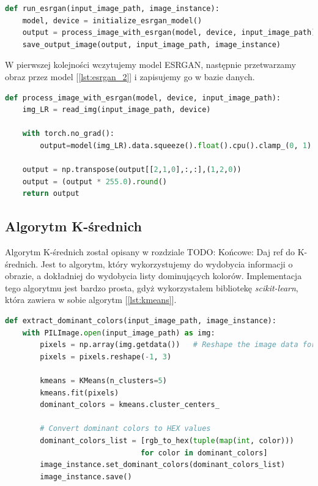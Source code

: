\begin{lstlisting}[language=Python, caption=Implementacja algorytmu ESRGAN., label={lst:esrgan}]    
def run_esrgan(input_image_path, image_instance):
    model, device = initialize_esrgan_model()
    output = process_image_with_esrgan(model, device, input_image_path)
    save_output_image(output, input_image_path, image_instance)
\end{lstlisting}

W pierwszej kolejności wczytujemy model ESRGAN, następnie przetwarzamy obraz przez model [\ref{lst:esrgan_2}] i zapisujemy go w bazie danych.


\begin{lstlisting}[language=Python, caption=Przetwarzanie przez model ESRGAN., label={lst:esrgan_2}]
def process_image_with_esrgan(model, device, input_image_path):
    img_LR = read_img(input_image_path, device)

    with torch.no_grad():
        output=model(img_LR).data.squeeze().float().cpu().clamp_(0, 1).numpy()
    
    output = np.transpose(output[[2,1,0],:,:],(1,2,0))
    output = (output * 255.0).round()
    return output
\end{lstlisting}


\subsection*{Algorytm K-średnich}

Algorytm K-średnich został opisany w rozdziale
TODO: Końcowe: Daj ref do K-średnich.
Jest to algorytm, który wykorzystujemy do wydobycia informacji o obrazie, a dokładniej do wydobycia listy dominujących kolorów. Implementacja tego algorytmu jest bardzo prosta, gdyż wykorzystałem bibliotekę \textit{scikit-learn}, która zawiera w sobie algorytm [\ref{lst:kmeans}].

\begin{lstlisting}[language=Python, caption=Implementacja algorytmu K-średnich., label={lst:kmeans}]
def extract_dominant_colors(input_image_path, image_instance):
    with PILImage.open(input_image_path) as img:
        pixels = np.array(img.getdata())   # Reshape the image data for k-means
        pixels = pixels.reshape(-1, 3)

        kmeans = KMeans(n_clusters=5)
        kmeans.fit(pixels)
        dominant_colors = kmeans.cluster_centers_

        # Convert dominant colors to HEX values
        dominant_colors_list = [rgb_to_hex(tuple(map(int, color))) 
                               for color in dominant_colors]
        image_instance.set_dominant_colors(dominant_colors_list)
        image_instance.save()
\end{lstlisting}

